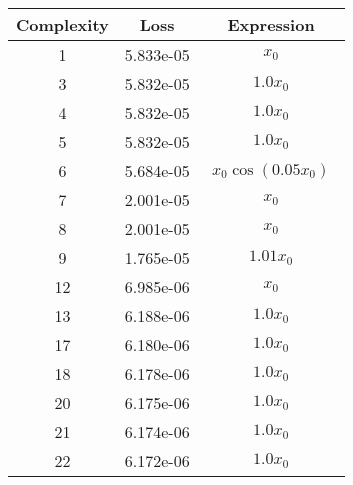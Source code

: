 \begin{center}
        \begin{tabular}{|c|c|c|}
        \hline
        Complexity & Loss & Expression \\
        \hline
        1 & 5.833e-05 & $\begin{aligned}x_{0}\end{aligned}$\\ \hline3 & 5.832e-05 & $\begin{aligned}1.0 x_{0}\end{aligned}$\\ \hline4 & 5.832e-05 & $\begin{aligned}1.0 x_{0}\end{aligned}$\\ \hline5 & 5.832e-05 & $\begin{aligned}1.0 x_{0}\end{aligned}$\\ \hline6 & 5.684e-05 & $\begin{aligned}x_{0} \cos{\left(0.05 x_{0} \right)}\end{aligned}$\\ \hline7 & 2.001e-05 & $\begin{aligned}x_{0}\end{aligned}$\\ \hline8 & 2.001e-05 & $\begin{aligned}x_{0}\end{aligned}$\\ \hline9 & 1.765e-05 & $\begin{aligned}1.01 x_{0}\end{aligned}$\\ \hline12 & 6.985e-06 & $\begin{aligned}x_{0}\end{aligned}$\\ \hline13 & 6.188e-06 & $\begin{aligned}1.0 x_{0}\end{aligned}$\\ \hline17 & 6.180e-06 & $\begin{aligned}1.0 x_{0}\end{aligned}$\\ \hline18 & 6.178e-06 & $\begin{aligned}1.0 x_{0}\end{aligned}$\\ \hline20 & 6.175e-06 & $\begin{aligned}1.0 x_{0}\end{aligned}$\\ \hline21 & 6.174e-06 & $\begin{aligned}1.0 x_{0}\end{aligned}$\\ \hline22 & 6.172e-06 & $\begin{aligned}1.0 x_{0}\end{aligned}$\\ \hline\end{tabular}
        \end{center}
        